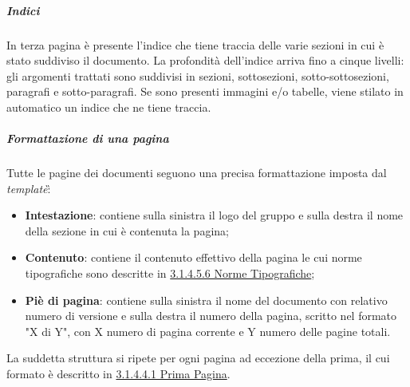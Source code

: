 \subparagraph{Indici}
In terza pagina è presente l'indice che tiene traccia delle varie sezioni in cui è stato suddiviso il documento. La profondità dell'indice arriva fino a cinque livelli: gli argomenti trattati sono suddivisi in sezioni, sottosezioni, sotto-sottosezioni, paragrafi e sotto-paragrafi.
Se sono presenti immagini e/o tabelle, viene stilato in automatico un indice che ne tiene traccia.
\subparagraph{Formattazione di una pagina}
Tutte le pagine dei documenti seguono una precisa formattazione imposta dal \textit{template}\G :
\begin{itemize}
	\item{\textbf{Intestazione}}: contiene sulla sinistra il logo del gruppo e sulla destra il nome della sezione in cui è contenuta la pagina;
	\item{\textbf{Contenuto}}: contiene il contenuto effettivo della pagina le cui norme tipografiche sono descritte in \hyperref[sec:normeTipografiche]{3.1.4.5.6 Norme Tipografiche};
	\item{\textbf{Piè di pagina}}: contiene sulla sinistra il nome del documento con relativo numero di versione e sulla destra il numero della pagina, scritto nel formato "X di Y", con X numero di pagina corrente e Y numero delle pagine totali.
\end{itemize}
La suddetta struttura si ripete per ogni pagina ad eccezione della prima, il cui formato è descritto in \hyperref[sec:primaPagina]{3.1.4.4.1 Prima Pagina}.

